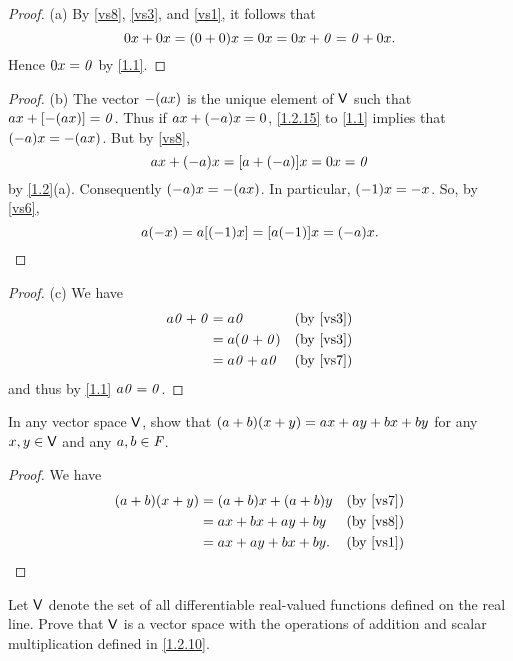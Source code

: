 \begin{proof}{(a)}
	By \ref{vs8}, \ref{vs3}, and \ref{vs1}, it follows that
	\[
		0x + 0x = \p{0 + 0} x = 0x = 0x + \zv = \zv + 0x.
	\]
	Hence \(0x = \mathit{0}\) by \cref{1.1}.
\end{proof}

\begin{proof}{(b)}
	The vector \(-\p{ax}\) is the unique element of \(\mathsf{V}\) such that \(ax + \bk{-\p{ax}} = \zv\).
	Thus if \(ax + \p{-a}x = 0\), \cref{1.2.15} to \cref{1.1} implies that \(\p{-a}x = -\p{ax}\).
	But by \ref{vs8},
	\[
		ax + \p{-a}x = \bk{a + \p{-a}}x = 0x = \zv
	\]
	by \cref{1.2}(a).
	Consequently \(\p{-a}x = -\p{ax}\).
	In particular, \(\p{-1}x = -x\).
	So, by \ref{vs6},
	\[
		a\p{-x} = a\bk{\p{-1}x} = \bk{a\p{-1}}x = \p{-a}x.
	\]
\end{proof}

\begin{proof}{(c)}
	We have
	\begin{align*}
		a\zv + \zv & = a\zv           &  & \text{(by \ref{vs3})} \\
		           & = a\p{\zv + \zv} &  & \text{(by \ref{vs3})} \\
		           & = a\zv + a\zv    &  & \text{(by \ref{vs7})}
	\end{align*}
	and thus by \cref{1.1} \(a\mathit{0} = \mathit{0}\).
\end{proof}

\exercisesection

\setcounter{ex}{7}
\begin{ex}\label{ex:1.2.8}
	In any vector space \(\mathsf{V}\), show that \(\p{a + b}\p{x + y} = ax + ay + bx + by\) for any \(x, y \in \mathsf{V}\) and any \(a, b \in \mathit{F}\).
\end{ex}

\begin{proof}
	We have
	\begin{align*}
		\p{a + b}\p{x + y} & = \p{a + b} x + \p{a + b} y &  & \text{(by \ref{vs7})} \\
		                   & = ax + bx + ay + by         &  & \text{(by \ref{vs8})} \\
		                   & = ax + ay + bx + by.        &  & \text{(by \ref{vs1})}
	\end{align*}
\end{proof}

\setcounter{ex}{9}
\begin{ex}\label{ex:1.2.10}
	Let \(\mathsf{V}\) denote the set of all differentiable real-valued functions defined on the real line.
	Prove that \(\mathsf{V}\) is a vector space with the operations of addition and scalar multiplication defined in \cref{1.2.10}.
\end{ex}

